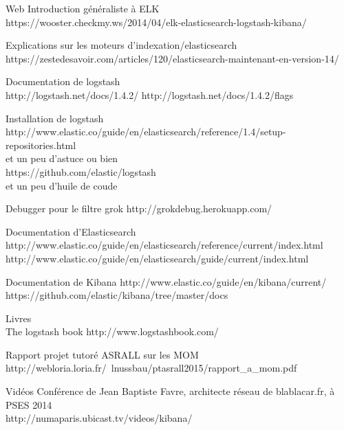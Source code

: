 Web
Introduction généraliste à ELK \\

https://wooster.checkmy.ws/2014/04/elk-elasticsearch-logstash-kibana/

Explications sur les moteurs d'indexation/elasticsearch\\
https://zestedesavoir.com/articles/120/elasticsearch-maintenant-en-version-14/



Documentation de logstash\\
http://logstash.net/docs/1.4.2/
http://logstash.net/docs/1.4.2/flags

Installation de logstash
http://www.elastic.co/guide/en/elasticsearch/reference/1.4/setup-repositories.html
\\ et un peu d'astuce ou bien \\
https://github.com/elastic/logstash
\\ et un peu d'huile de coude


Debugger pour le filtre grok
http://grokdebug.herokuapp.com/


Documentation d'Elasticsearch\\
http://www.elastic.co/guide/en/elasticsearch/reference/current/index.html\\
http://www.elastic.co/guide/en/elasticsearch/guide/current/index.html



Documentation de Kibana
http://www.elastic.co/guide/en/kibana/current/
https://github.com/elastic/kibana/tree/master/docs


Livres\\
The logstash book
http://www.logstashbook.com/

Rapport projet tutoré ASRALL sur les MOM
http://webloria.loria.fr/~lnussbau/ptasrall2015/rapport\_a\_mom.pdf


Vidéos
Conférence de Jean Baptiste Favre, architecte réseau de blablacar.fr, à PSES 2014\\
http://numaparis.ubicast.tv/videos/kibana/

